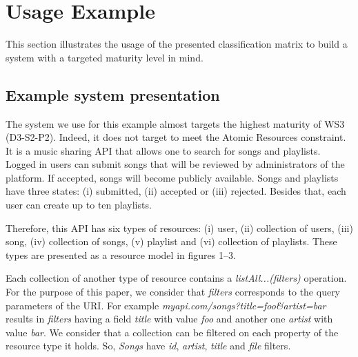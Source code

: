 \section{Usage Example}





This section illustrates the usage of the presented classification matrix to build a system with a targeted maturity level in mind.

\subsection{Example system presentation}

The system we use for this example almost targets the highest maturity of WS3 (D3-S2-P2). Indeed, it does not target to meet the Atomic Resources constraint. It is a music sharing API that allows one to search for songs and playlists. Logged in users can submit songs that will be reviewed by administrators of the platform. If accepted, songs will become publicly available. Songs and playlists have three states: (i) submitted, (ii) accepted or (iii) rejected. Besides that, each user can create up to ten playlists.

Therefore, this API has six types of resources: (i) user, (ii) collection of users, (iii) song, (iv) collection of songs, (v) playlist and (vi) collection of playlists. These types are presented as a resource model in figures 1--3.

Each collection of another type of resource contains a \textit{listAll...(filters)} operation. For the purpose of this paper, we consider that \textit{filters} corresponds to the query parameters of the URI. For example \textit{myapi.com/songs?title=foo\&artist=bar} results in \textit{filters} having a field \textit{title} with value \textit{foo} and another one \textit{artist} with value \textit{bar}. We consider that a collection can be filtered on each property of the resource type it holds. So, \textit{Songs} have \textit{id}, \textit{artist}, \textit{title} and \textit{file} filters.

